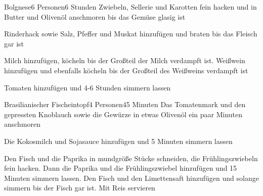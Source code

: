 
\begin{recipe}{Bolgnese}{6 Personen}{6 Stunden}
Zwiebeln, Sellerie und Karotten fein hacken und  in Butter und Olivenöl anschmoren bis das Gemüse glasig ist

Rinderhack sowie Salz, Pfeffer und Muskat hinzufügen und braten bis das Fleisch gar ist

Milch hinzufügen, köcheln bis der Großteil der Milch verdampft ist.
Weißwein hinzufügen und ebenfalls köcheln bis der Großteil des Weißweins verdampft ist

Tomaten hinzufügen und 4-6 Stunden simmern lassen
\end{recipe}


\begin{recipe}{Brasilianischer Fischeintopf}{4 Personen}{45 Minuten}
Das Tomatenmark und den gepressten Knoblauch sowie die Gewürze in etwas Olivenöl ein paar Minuten anschmoren

Die Kokosmilch und Sojasauce hinzufügen und 5 Minuten simmern lassen

Den Fisch und die Paprika in mundgröße Stücke schneiden, die Frühlingszwiebeln fein hacken.
Dann die Paprika und die Frühlingszwiebel hinzufügen und 15 Minuten simmern lassen.
Den Fisch und den Limettensaft hinzufügen und solange simmern bis der Fisch gar ist.
Mit Reis servieren
\end{recipe}


